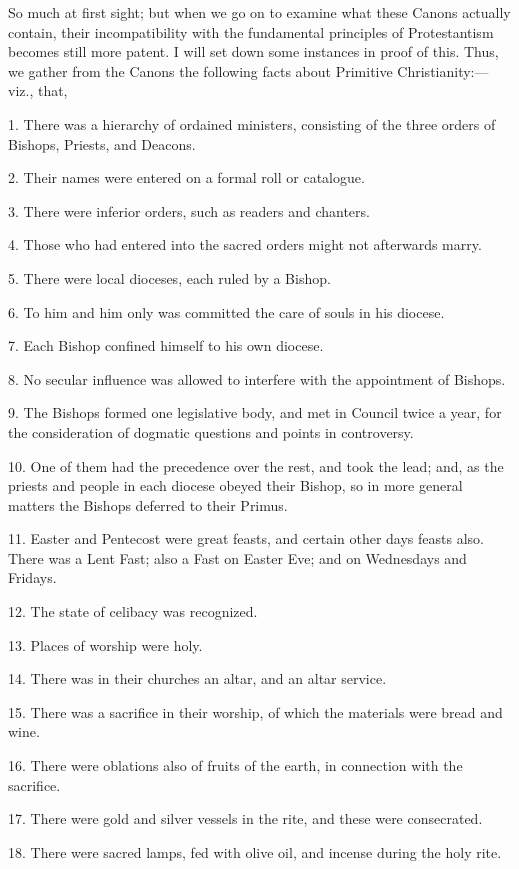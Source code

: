 So much at first sight; but when we go on to examine what these
Canons actually contain, their incompatibility with the fundamental
principles of Protestantism becomes still more patent. I will set down
some instances in proof of this. Thus, we gather from the Canons the
following facts about Primitive Christianity:—viz., that,

1. There was a hierarchy of ordained ministers, consisting of the
three orders of Bishops, Priests, and Deacons.

2. Their names were entered on a formal roll or catalogue.

3. There were inferior orders, such as readers and chanters.

4. Those who had entered into the sacred orders might not
afterwards marry.

5. There were local dioceses, each ruled by a Bishop.

6. To him and him only was committed the care of souls in his
diocese.

7. Each Bishop confined himself to his own diocese.

8. No secular influence was allowed to interfere with the
appointment of Bishops.

9. The Bishops formed one legislative body, and met in Council
twice a year, for the consideration of dogmatic questions and points
in controversy.

10. One of them had the precedence over the rest, and took the
lead; and, as the priests and people in each diocese obeyed their
Bishop, so in more general matters the Bishops deferred to their
Primus.

11. Easter and Pentecost were great feasts, and certain other days
feasts also. There was a Lent Fast; also a Fast on Easter Eve; and on
Wednesdays and Fridays.

12. The state of celibacy was recognized.

13. Places of worship were holy.

14. There was in their churches an altar, and an altar service.

15. There was a sacrifice in their worship, of which the materials
were bread and wine.

16. There were oblations also of fruits of the earth, in connection
with the sacrifice.

17. There were gold and silver vessels in the rite, and these were
consecrated.

18. There were sacred lamps, fed with olive oil, and incense during
the holy rite.

